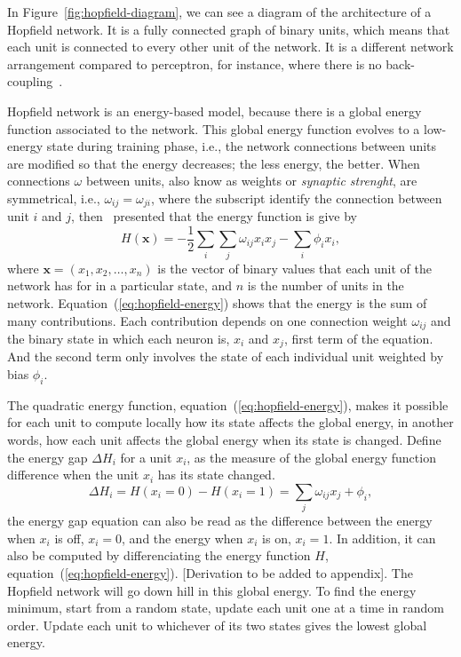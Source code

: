 In Figure~\ref{fig:hopfield-diagram}, we can see a diagram of the architecture of a Hopfield network.
It is a fully connected graph of binary units, which means that each unit is connected to every other unit of the network.
It is a different network arrangement compared to perceptron, for instance, where there is no back-coupling~\cite{bib:hopfield1982}.


Hopfield network is an energy-based model, because there is a global energy function associated to the network.
This global energy function evolves to a low-energy state during training phase, i.e., the network connections between units are modified so that the energy decreases; the less energy, the better.
When connections $\omega$ between units, also know as weights or \textit{synaptic strenght}, are symmetrical, i.e., $\omega_{ij} = \omega_{ji}$, where the subscript identify the connection between unit $i$ and $j$, then~\cite{bib:hopfield1982} presented that the energy function is give by
\begin{equation}\label{eq:hopfield-energy}
  H(\mathbf{x}) = -\frac{1}{2}\sum_{i} \sum_{j} \omega_{ij} x_{i} x_{j} - \sum_{i} \phi_{i} x_{i},
\end{equation}
where $\mathbf{x} = (x_{1}, x_{2}, \dots, x_{n})$ is the vector of binary values that each unit of the network has for in a particular state, and $n$ is the number of units in the network.
Equation~(\ref{eq:hopfield-energy}) shows that the energy is the sum of many contributions.
Each contribution depends on one connection weight $\omega_{ij}$ and the binary state in which each neuron is, $x_{i}$ and $x_{j}$, first term of the equation.
And the second term only involves the state of each individual unit weighted by bias $\phi_{i}$.

The quadratic energy function, equation~(\ref{eq:hopfield-energy}), makes it possible for each unit to compute locally how its state affects the global energy, in another words, how each unit affects the global energy when its state is changed.
Define the energy gap $\Delta H_{i}$ for a unit $x_{i}$, as the measure of the global energy function difference when the unit $x_{i}$ has its state changed.
\begin{equation}\label{eq:hopfield-energy-gap}
  \Delta H_{i} = H(x_{i} = 0) - H(x_{i} = 1) = \sum_{j} \omega_{ij} x_{j} + \phi_{i},
\end{equation}
the energy gap equation can also be read as the difference between the energy when $x_{i}$ is off, $x_{i} = 0$, and the energy when $x_{i}$ is on, $x_{i} = 1$.
In addition, it can also be computed by differenciating the energy function $H$, equation~(\ref{eq:hopfield-energy}). [Derivation to be added to appendix].
The Hopfield network will go down hill in this global energy.
To find the energy minimum, start from a random state, update each unit one at a time in random order. Update each unit to whichever of its two states gives the lowest global energy.

